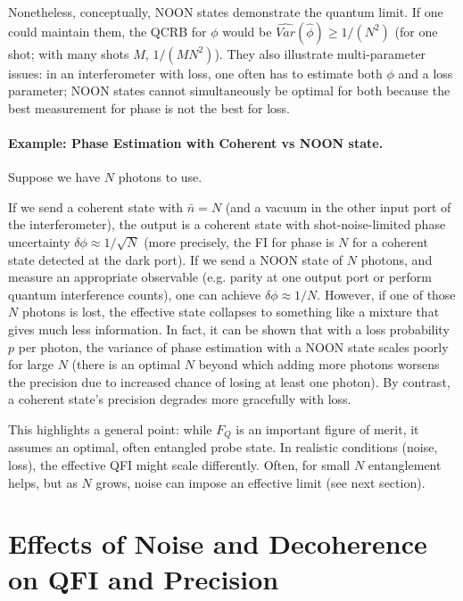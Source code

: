 Nonetheless, conceptually, NOON states demonstrate the quantum
limit. If one could maintain them, the QCRB for $\phi$ would be
$\widehat{Var}(\hat{\phi}) \ge 1/(N^2)$ (for one shot; with many shots $M$,
$1/(M N^2)$). They also illustrate multi-parameter issues: in an
interferometer with loss, one often has to estimate both $\phi$ and a
loss parameter; NOON states cannot simultaneously be optimal for both
because the best measurement for phase is not the best for loss.



\paragraph{Example: Phase Estimation with Coherent vs NOON state.} Suppose we have $N$ photons to use.



If we send a coherent state with $\bar{n}=N$ (and a vacuum in the
other input port of the interferometer), the output is a coherent
state with shot-noise-limited phase uncertainty $\delta \phi \approx
1/\sqrt{N}$ (more precisely, the FI for phase is $N$ for a coherent
state detected at the dark port).  If we send a NOON state of $N$
photons, and measure an appropriate observable (e.g. parity at one
output port or perform quantum interference counts), one can achieve
$\delta \phi \approx 1/N$. However, if one of those $N$ photons is
lost, the effective state collapses to something like a mixture that
gives much less information. In fact, it can be shown that with a loss
probability $p$ per photon, the variance of phase estimation with a
NOON state scales poorly for large $N$ (there is an optimal $N$ beyond
which adding more photons worsens the precision due to increased
chance of losing at least one photon). By contrast, a coherent state’s
precision degrades more gracefully with loss.




This highlights a general point: while $F_Q$ is an important figure of
merit, it assumes an optimal, often entangled probe state. In
realistic conditions (noise, loss), the effective QFI might scale
differently. Often, for small $N$ entanglement helps, but as $N$
grows, noise can impose an effective limit (see next section).



\section{Effects of Noise and Decoherence on QFI and Precision}

